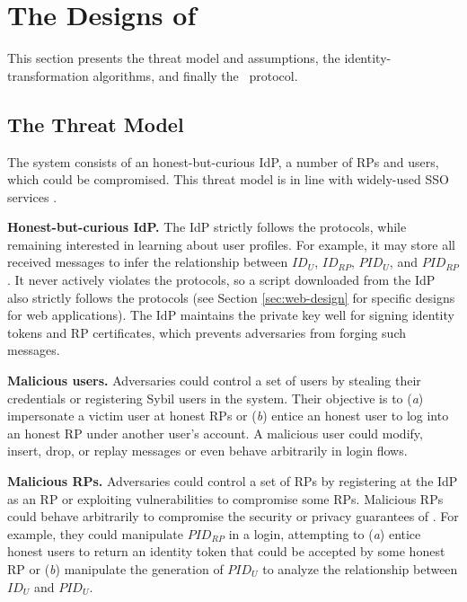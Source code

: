 \section{The Designs of \usso}
\label{sec:UPPRESSO}

This section presents the threat model and assumptions, the identity-transformation algorithms, and finally the \usso\ protocol.

\subsection{The Threat Model}
\label{subsec:threatmodel}
The system consists of an honest-but-curious IdP,
 a number of RPs and users, which could be compromised. %
This threat model is in line with widely-used SSO services \cite{OpenIDConnect,rfc6749, SAML, SAMLIdentifier}.

\noindent \textbf{Honest-but-curious IdP.} The IdP strictly follows the protocols,
 while remaining interested in learning about user profiles.
For example, it may store all received messages to infer the relationship between $ID_U$, $ID_{RP}$, $PID_{U}$, and $PID_{RP}$.
It never actively violates the protocols, so a script downloaded from the IdP also strictly follows the protocols (see Section \ref{sec:web-design} for specific designs for web applications).
The IdP maintains the private key well for signing identity tokens and RP certificates, %
which prevents adversaries from forging such messages.

\noindent \textbf{Malicious users.} Adversaries could control a set of users by stealing their credentials or registering Sybil users in the system.
 Their objective is to (\emph{a}) impersonate a victim user at honest RPs or (\emph{b}) entice an honest user to log into an honest RP under another user's account.
A malicious user could modify, insert, drop, or replay messages or even behave arbitrarily in login flows.

\noindent \textbf{Malicious RPs.}
Adversaries could control a set of RPs by registering at the IdP as an RP or exploiting vulnerabilities to compromise some RPs. Malicious RPs could behave arbitrarily to compromise the security or privacy guarantees of \usso.
For example, they could manipulate $PID_{RP}$ in a login, attempting to (\emph{a}) entice honest users to return an identity token that could be accepted by some honest RP or (\emph{b}) manipulate the generation of $PID_U$ to analyze the relationship between $ID_U$ and $PID_U$.

